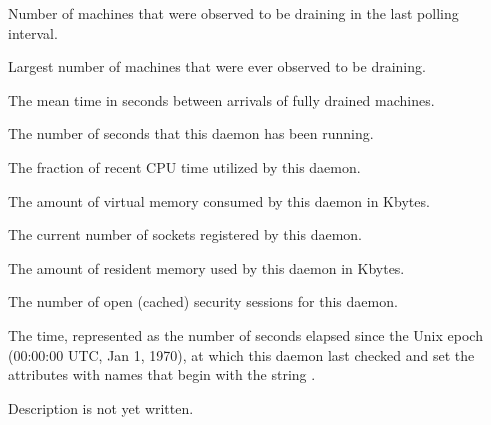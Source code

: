 \begin{description}
\item[\AdAttr{MachinesDraining}:] Number of machines that were observed
  to be draining in the last polling interval.

\item[\AdAttr{MachinesDrainingPeak}:] Largest number of machines that were
ever observed to be draining.

\item[\AdAttr{MeanDrainedArrived}:] The mean time in seconds 
between arrivals of fully drained machines.

\item[\AdAttr{MonitorSelfAge}:] The number of seconds that this daemon
  has been running.

\item[\AdAttr{MonitorSelfCPUUsage}:] The fraction of recent CPU time utilized
  by this daemon. 

\item[\AdAttr{MonitorSelfImageSize}:] The amount of virtual memory consumed by
  this daemon in Kbytes.

\item[\AdAttr{MonitorSelfRegisteredSocketCount}:] The current number of sockets
  registered by this daemon.

\item[\AdAttr{MonitorSelfResidentSetSize}:] The amount of resident memory
  used by this daemon in Kbytes.

\item[\AdAttr{MonitorSelfSecuritySessions}:] The number of open (cached)
  security sessions for this daemon.

\item[\AdAttr{MonitorSelfTime}:] The  time, represented as the number of
  seconds elapsed since the Unix epoch (00:00:00 UTC, Jan 1, 1970),
  at which this daemon last checked and set the attributes with names that
  begin with the string .
  
\item[\AdAttr{MyAddress}:] Description is not yet written.


\end{description}
